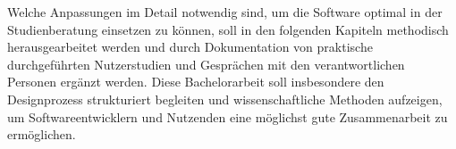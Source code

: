 Welche Anpassungen im Detail notwendig sind, um die Software optimal in der
Studienberatung einsetzen zu können, soll in den folgenden Kapiteln methodisch
herausgearbeitet werden und durch Dokumentation von praktische durchgeführten
Nutzerstudien und Gesprächen mit den verantwortlichen Personen ergänzt werden.
Diese Bachelorarbeit soll insbesondere den Designprozess strukturiert begleiten
und wissenschaftliche Methoden aufzeigen, um Softwareentwicklern und Nutzenden
eine möglichst gute Zusammenarbeit zu ermöglichen.